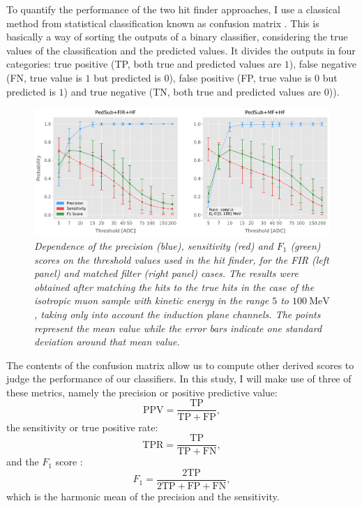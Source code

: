 To quantify the performance of the two hit finder approaches, I use a classical method from statistical classification known as confusion matrix \cite{Stehman1997}. This is basically a way of sorting the outputs of a binary classifier, considering the true values of the classification and the predicted values. It divides the outputs in four categories: true positive (TP, both true and predicted values are $1$), false negative (FN, true value is $1$ but predicted is $0$), false positive (FP, true value is $0$ but predicted is $1$) and true negative (TN, both true and predicted values are $0$)).

\begin{figure}[t]
	\centering
	\includegraphics[width=.99\linewidth]{Images/Matched_Filter/hit_study_muon_scores_indct}
	\caption{\textit{Dependence of the precision (blue), sensitivity (red) and $F_{1}$ (green) scores on the threshold values used in the hit finder, for the FIR (left panel) and matched filter (right panel) cases. The results were obtained after matching the hits to the true hits in the case of the isotropic muon sample with kinetic energy in the range $5$ to $100 \ \mathrm{MeV}$, taking only into account the induction plane channels. The points represent the mean value while the error bars indicate one standard deviation around that mean value.}}
	\label{fig:threshold_opt}
\end{figure}

The contents of the confusion matrix allow us to compute other derived scores to judge the performance of our classifiers. In this study, I will make use of three of these metrics, namely the precision or positive predictive value:
\begin{equation}
	\mathrm{PPV} = \frac{\mathrm{TP}}{\mathrm{TP} + \mathrm{FP}},
\end{equation}
the sensitivity or true positive rate:
\begin{equation}
	\mathrm{TPR} = \frac{\mathrm{TP}}{\mathrm{TP} + \mathrm{FN}},
\end{equation}
and the $F_{1}$ score \cite{Taha2015}:
\begin{equation}
	F_{1} = \frac{\mathrm{2 TP}}{2\mathrm{TP} + \mathrm{FP} + \mathrm{FN}},
\end{equation}
which is the harmonic mean of the precision and the sensitivity.

